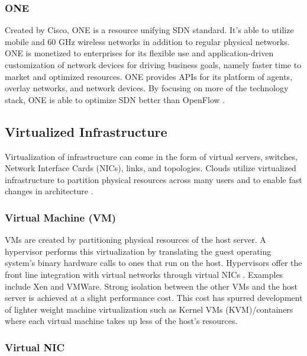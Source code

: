\documentclass[12pt]{article}
\begin{document}
\subsubsection{ONE}

Created by Cisco, ONE \cite{ciscoone} is a resource unifying SDN standard. It's able to utilize mobile and 60 GHz wireless networks in addition to regular physical networks. ONE is monetized to enterprises for its flexible use and application-driven customization of network devices for driving business goals, namely faster time to market and optimized resources. ONE provides APIs for its platform of agents, overlay networks, and network devices. By focusing on more of the technology stack, ONE is able to optimize SDN better than OpenFlow \cite{wang2015survey}.



\subsection{Virtualized Infrastructure}

Virtualization of infrastructure can come in the form of virtual servers, switches, Network Interface Cards (NICs), links, and topologies. Clouds utilize virtualized infrastructure to partition physical resources across many users and to enable fast changes in architecture \cite{wang2015survey}.


\subsubsection{Virtual Machine (VM)}

VMs are created by partitioning physical resources of the host server. A hypervisor performs this virtualization by translating the guest operating system's binary hardware calls to ones that run on the host. Hypervisors offer the front line integration with virtual networks through virtual NICs \cite{wang2015survey}. Examples include Xen and VMWare. Strong isolation between the other VMs and the host server is achieved at a slight performance cost. This cost has spurred development of lighter weight machine virtualization such as Kernel VMs (KVM)/containers \cite{oci,docker} where each virtual machine takes up less of the host's resources.

\subsubsection{Virtual NIC}
\end{document}
